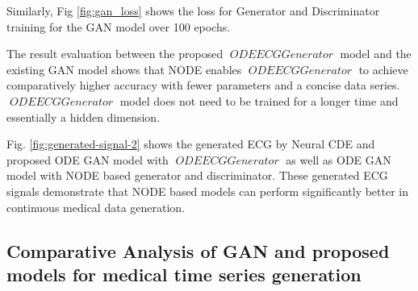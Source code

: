 \documentclass{article}
\DeclareMathOperator{\ODEECGGenerator}{\textit{ODEECGGenerator}}
\begin{document}
Similarly, Fig \ref{fig:gan_loss} shows the loss for Generator and Discriminator training for the GAN model over 100 epochs. 

\begin{figure*} [htb]
  \label{fig:gloss}
\hfill
{}\label{fig:dloss}
\vfill
\caption{Loss analysis for training GAN model}
\label{fig:gan_loss}
\end{figure*}


The result evaluation between the proposed  $\ODEECGGenerator$ model and the existing GAN model shows that NODE enables  $\ODEECGGenerator$ to achieve comparatively higher accuracy with fewer parameters and a concise data series.   $\ODEECGGenerator$ model does not need to be trained for a longer time and essentially a hidden dimension. 

\begin{figure*} [htb]
  \label{fig:neuralcde-perf}
\hfill
{}\label{fig:odegan-perf}
\vfill
{}\label{fig:odegan2-perf}
\caption{Generated ECG signals by different models}
\label{fig:generated-signal-2}
\end{figure*}


Fig. \ref{fig:generated-signal-2} shows the generated ECG by Neural CDE and proposed ODE GAN model with $\ODEECGGenerator$ as well as ODE GAN model with NODE based generator and discriminator. These generated ECG signals demonstrate that NODE based models can perform significantly better in continuous medical data generation.



\subsection{Comparative Analysis of GAN and proposed models for medical time series generation}
\end{document}
